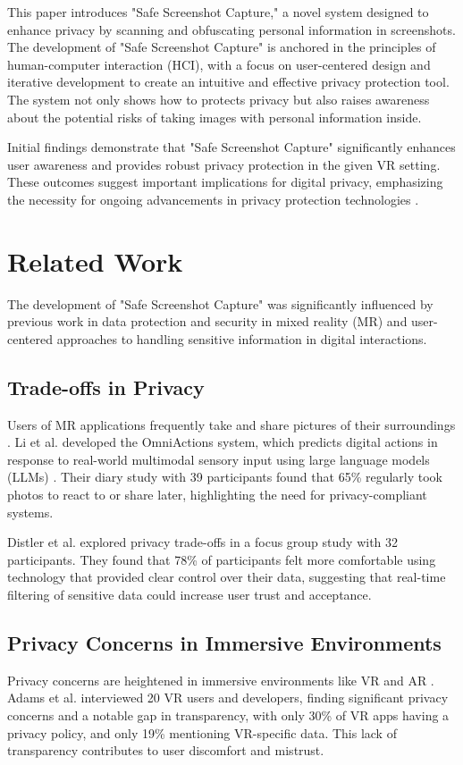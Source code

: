 \documentclass[sigconf,authordraft]{acmart}
\begin{document}
This paper introduces "Safe Screenshot Capture," a novel system designed to enhance privacy by scanning and obfuscating personal information in screenshots. The development of "Safe Screenshot Capture" is anchored in the principles of human-computer interaction (HCI), with a focus on user-centered design and iterative development to create an intuitive and effective privacy protection tool. The system not only shows how to protects privacy but also raises awareness about the potential risks of taking images with personal information inside.

Initial findings demonstrate that "Safe Screenshot Capture" significantly enhances user awareness and provides robust privacy protection in the given VR setting. These outcomes suggest important implications for digital privacy, emphasizing the necessity for ongoing advancements in privacy protection technologies \cite{distler2020how}.

\section{Related Work}
The development of "Safe Screenshot Capture" was significantly influenced by previous work in data protection and security in mixed reality (MR) and user-centered approaches to handling sensitive information in digital interactions.

\subsection{Trade-offs in Privacy}
Users of MR applications frequently take and share pictures of their surroundings \cite{li2024omniactions}. Li et al. \cite{li2024omniactions} developed the OmniActions system, which predicts digital actions in response to real-world multimodal sensory input using large language models (LLMs) \cite{li2024omniactions}. Their diary study with 39 participants found that 65\% regularly took photos to react to or share later, highlighting the need for privacy-compliant systems.

Distler et al. \cite{distler2020how} explored privacy trade-offs in a focus group study with 32 participants. They found that 78\% of participants felt more comfortable using technology that provided clear control over their data, suggesting that real-time filtering of sensitive data could increase user trust and acceptance.

\subsection{Privacy Concerns in Immersive Environments}
Privacy concerns are heightened in immersive environments like VR and AR \cite{adams2018ethics}. Adams et al. \cite{adams2018ethics} interviewed 20 VR users and developers, finding significant privacy concerns and a notable gap in transparency, with only 30\% of VR apps having a privacy policy, and only 19\% mentioning VR-specific data. This lack of transparency contributes to user discomfort and mistrust.
\end{document}
